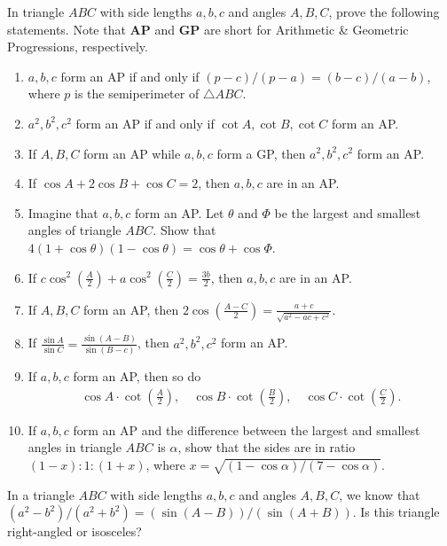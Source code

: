 \documentclass[12pt,a4paper]{memoir}
\theoremstyle{definition}
\begin{document}
	\begin{question}[name=Law of Sines and Law of Cosines in Progressions]
		In triangle $ABC$ with side lengths $a,b,c$ and angles $A,B,C$, prove the following statements. Note that \textbf{AP} and \textbf{GP} are short for Arithmetic \& Geometric Progressions, respectively.
		\begin{enumerate}
			\item $a,b,c$ form an AP if and only if $(p-c)/(p-a) = (b-c)/(a-b)$, where $p$ is the semiperimeter of $\triangle ABC$.
			\item $a^2,b^2,c^2$ form an AP if and only if $\cot A, \cot B, \cot C$ form an AP.
			\item If $A,B,C$ form an AP while $a,b,c$ form a GP, then $a^2,b^2,c^2$ form an AP.
			\item If $\cos A + 2\cos B + \cos C = 2$, then $a,b,c$ are in an AP.
			\item Imagine that $a,b,c$ form an AP. Let $\theta$ and $\Phi$ be the largest and smallest angles of triangle $ABC$. Show that $4(1+\cos \theta)(1-\cos \theta)=\cos \theta + \cos \Phi$.
			\item If $\displaystyle c\cos^2\left(\frac{A}{2}\right)+ a\cos^2\left(\frac{C}{2}\right) = \frac{3b}{2}$, then $a,b,c$ are in an AP.
			\item If $A,B,C$ form an AP, then $\displaystyle 2\cos\left(\frac{A-C}{2}\right) = \frac{a+c}{\sqrt{a^2-ac+c^2}}$.
			\item If $\displaystyle \frac{\sin A}{\sin C} = \frac{\sin(A-B)}{\sin(B-c)}$,
			then $a^2,b^2,c^2$ form an AP.
			\item If $a,b,c$ form an AP, then so do
			\begin{align*}
				\cos A \cdot \cot\left(\frac{A}{2}\right), \quad \cos B \cdot \cot\left(\frac{B}{2}\right), \quad \cos C \cdot \cot\left(\frac{C}{2}\right).
			\end{align*}
			\item If $a,b,c$ form an AP and the difference between the largest and smallest angles in triangle $ABC$ is $\alpha$, show that the sides are in ratio $(1-x):1:(1+x)$, where $\displaystyle x = \sqrt{(1-\cos \alpha)/(7-\cos \alpha)}$.
		\end{enumerate}
	\end{question}



\begin{question}
	In a triangle $ABC$ with side lengths $a,b,c$ and angles $A,B,C$, we know that $\displaystyle ({a^2-b^2})/({a^2+b^2}) = (\sin(A-B))/(\sin(A+B))$.
	Is this triangle right-angled or isosceles?
\end{question}
\end{document}
